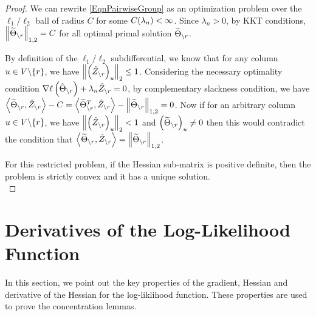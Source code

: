 \begin{proof}
We can rewrite \eqref{EqnPairwiseGroup} as an optimization problem over the $\ell_1/\ell_2$ ball of radius $C$ for some $C(\lambda_n)<\infty$. Since $\lambda_n>0$, by KKT conditions, $\left\|\widetilde{\Theta}_{\backslash r}\right\|_{1,2}=C$ for all optimal primal solution $\widetilde{\Theta}_{\backslash r}$.

\noindent By definition of the $\ell_1/\ell_2$ subdifferential, we know that for any column $u\in V\backslash\{r\}$, we have $\left\|\left(\hat{Z}_{\backslash r}\right)_u\right\|_2\leq 1$. Considering the necessary optimality condition $\nabla\ell\left(\hat{\Theta}_{\backslash r}\right)+\lambda_n \hat{Z}_{\backslash r}=0$, by complementary slackness condition, we have $\left<\widetilde{\Theta}_{\backslash r},\hat{Z}_{\backslash r}\right>-C=\left<\widetilde{\Theta}_{\backslash r}^T,\hat{Z}_{\backslash r}\right>-\left\|\widetilde{\Theta}_{\backslash r}\right\|_{1,2}=0$. Now if for an arbitrary column $u\in V\backslash\{r\}$, we have $\left\|\left(\hat{Z}_{\backslash r}\right)_u\right\|_2<1$ and $\left(\widetilde{\Theta}_{\backslash r}\right)_u \neq 0$ then this would contradict the condition that $\left<\widetilde{\Theta}_{\backslash r},\hat{Z}_{\backslash r}\right> = \left\|\widetilde{\Theta}_{\backslash r}\right\|_{1,2}$.

For this restricted problem, if the Hessian sub-matrix is positive definite, then the problem is strictly convex and it has a unique solution.\\
\end{proof}



\section{Derivatives of the Log-Likelihood Function}
In this section, we point out the key properties of the gradient, Hessian and derivative of the Hessian for the log-liklihood function. These properties are used to prove the concentration lemmas.

